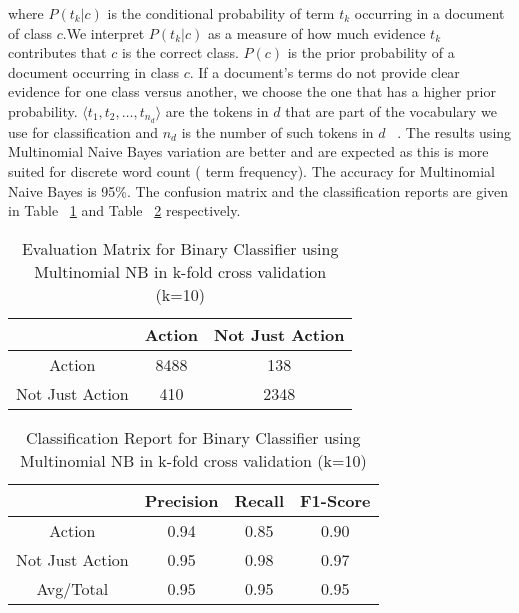 \documentclass[11pt,letterpaper]{article}
\begin{document}
 where  $P(t_k|c)$ is the conditional probability of term  $t_k$ occurring in a document of class $c$.We interpret  $P(t_k|c)$ as a measure of how much evidence  $t_k$ contributes that $c$ is the correct class. $P(c)$ is the prior probability of a document occurring in class $c$. If a document's terms do not provide clear evidence for one class versus another, we choose the one that has a higher prior probability.  $\langle t_1,t_2,\ldots,t_{n_d}\rangle$ are the tokens in $d$ that are part of the vocabulary we use for classification and $n_d$ is the number of such tokens in $d$ ~\cite{salton1986introduction}. The results using Multinomial Naive Bayes variation are better and are expected as this is more suited for discrete word count ( term frequency). The accuracy for Multinomial Naive Bayes is 95\%. The confusion matrix and the classification reports are given in Table ~\ref{Evalution Matrix for Binary Classifier using Multinomial NB} and Table ~\ref{Classification Report for Binary Classifier using Multinomial NB} respectively.\\
 \begin{table}
\caption{Evaluation Matrix for Binary Classifier using Multinomial NB in k-fold cross validation (k=10)} \label{Evalution Matrix for Binary Classifier using Multinomial NB}
\begin{center}
\begin{tabular}{ |c|c|c| } 
 \hline
  & Action & Not Just Action \\ 
 \hline
 Action & 8488 & 138 \\ 
 Not Just Action & 410 & 2348 \\ 
 \hline
\end{tabular}
\end{center}
\end{table}

\begin{table}
\caption{Classification Report for Binary Classifier using Multinomial NB in k-fold cross validation (k=10)} \label{Classification Report for Binary Classifier using Multinomial NB}
\begin{center}
\begin{tabular}{ |c|c|c|c| } 
 \hline
  & Precision & Recall & F1-Score \\ 
 \hline
 Action & 0.94 & 0.85 & 0.90 \\ 
 Not Just Action & 0.95 & 0.98 & 0.97 \\ 
 Avg/Total & 0.95 & 0.95 & 0.95 \\
 \hline
\end{tabular}
\end{center}
\end{table}
\end{document}
